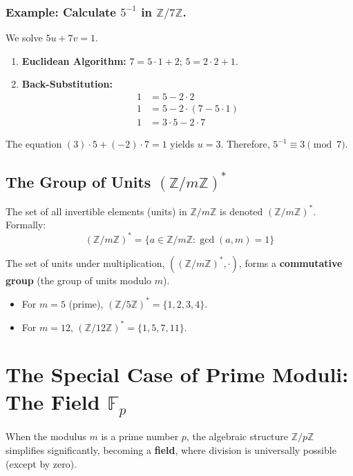 \subsubsection*{Example: Calculate $5^{-1}$ in $\mathbb{Z}/7\mathbb{Z}$.}
We solve $5u + 7v = 1$.
\begin{enumerate}
    \item \textbf{Euclidean Algorithm:} $7 = 5 \cdot 1 + 2$; $5 = 2 \cdot 2 + 1$.
    \item \textbf{Back-Substitution:}
    \begin{align*}
    1 &= 5 - 2 \cdot 2 \\
    1 &= 5 - 2 \cdot (7 - 5 \cdot 1) \\
    1 &= 3 \cdot 5 - 2 \cdot 7
    \end{align*}
\end{enumerate}
The equation $(3) \cdot 5 + (-2) \cdot 7 = 1$ yields $u=3$. Therefore, $5^{-1} \equiv 3 \pmod{7}$.

\subsection{The Group of Units $(\mathbb{Z}/m\mathbb{Z})^*$}
\begin{definition}
The set of all invertible elements (units) in $\mathbb{Z}/m\mathbb{Z}$ is denoted $(\mathbb{Z}/m\mathbb{Z})^*$. Formally:
$$ (\mathbb{Z}/m\mathbb{Z})^* = \{a \in \mathbb{Z}/m\mathbb{Z} : \gcd(a, m) = 1\} $$
\end{definition}

\begin{proposition}
The set of units under multiplication, $((\mathbb{Z}/m\mathbb{Z})^*, \cdot)$, forms a \textbf{commutative group} (the group of units modulo $m$).
\end{proposition}
\begin{itemize}
    \item For $m=5$ (prime), $(\mathbb{Z}/5\mathbb{Z})^* = \{1, 2, 3, 4\}$.
    \item For $m=12$, $(\mathbb{Z}/12\mathbb{Z})^* = \{1, 5, 7, 11\}$. 
\end{itemize}

\section{The Special Case of Prime Moduli: The Field $\mathbb{F}_p$}
When the modulus $m$ is a prime number $p$, the algebraic structure $\mathbb{Z}/p\mathbb{Z}$ simplifies significantly, becoming a \textbf{field}, where division is universally possible (except by zero).

